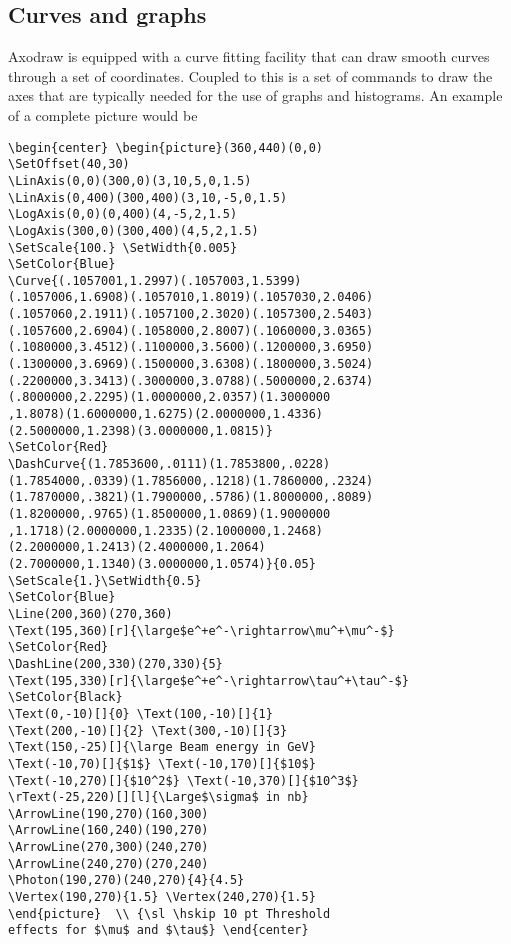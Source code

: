 \documentclass[11pt,a4paper]{article}
\begin{document}
\subsection{Curves and graphs}

Axodraw is equipped with a curve fitting facility that can draw smooth 
curves through a set of coordinates. Coupled to this is a set of 
commands to draw the axes that are typically needed for the use of 
graphs and histograms. An example of a complete picture would be
\IfColor{\textBlue}{}
\begin{verbatim}
\begin{center} \begin{picture}(360,440)(0,0)
\SetOffset(40,30)
\LinAxis(0,0)(300,0)(3,10,5,0,1.5)
\LinAxis(0,400)(300,400)(3,10,-5,0,1.5)
\LogAxis(0,0)(0,400)(4,-5,2,1.5)
\LogAxis(300,0)(300,400)(4,5,2,1.5)
\SetScale{100.} \SetWidth{0.005}
\SetColor{Blue}
\Curve{(.1057001,1.2997)(.1057003,1.5399)
(.1057006,1.6908)(.1057010,1.8019)(.1057030,2.0406)
(.1057060,2.1911)(.1057100,2.3020)(.1057300,2.5403)
(.1057600,2.6904)(.1058000,2.8007)(.1060000,3.0365)
(.1080000,3.4512)(.1100000,3.5600)(.1200000,3.6950)
(.1300000,3.6969)(.1500000,3.6308)(.1800000,3.5024)
(.2200000,3.3413)(.3000000,3.0788)(.5000000,2.6374)
(.8000000,2.2295)(1.0000000,2.0357)(1.3000000
,1.8078)(1.6000000,1.6275)(2.0000000,1.4336)
(2.5000000,1.2398)(3.0000000,1.0815)}
\SetColor{Red}
\DashCurve{(1.7853600,.0111)(1.7853800,.0228)
(1.7854000,.0339)(1.7856000,.1218)(1.7860000,.2324)
(1.7870000,.3821)(1.7900000,.5786)(1.8000000,.8089)
(1.8200000,.9765)(1.8500000,1.0869)(1.9000000
,1.1718)(2.0000000,1.2335)(2.1000000,1.2468)
(2.2000000,1.2413)(2.4000000,1.2064)
(2.7000000,1.1340)(3.0000000,1.0574)}{0.05}
\SetScale{1.}\SetWidth{0.5}
\SetColor{Blue}
\Line(200,360)(270,360)
\Text(195,360)[r]{\large$e^+e^-\rightarrow\mu^+\mu^-$}
\SetColor{Red}
\DashLine(200,330)(270,330){5}
\Text(195,330)[r]{\large$e^+e^-\rightarrow\tau^+\tau^-$}
\SetColor{Black}
\Text(0,-10)[]{0} \Text(100,-10)[]{1}
\Text(200,-10)[]{2} \Text(300,-10)[]{3}
\Text(150,-25)[]{\large Beam energy in GeV}
\Text(-10,70)[]{$1$} \Text(-10,170)[]{$10$}
\Text(-10,270)[]{$10^2$} \Text(-10,370)[]{$10^3$}
\rText(-25,220)[][l]{\Large$\sigma$ in nb}
\ArrowLine(190,270)(160,300)
\ArrowLine(160,240)(190,270)
\ArrowLine(270,300)(240,270)
\ArrowLine(240,270)(270,240)
\Photon(190,270)(240,270){4}{4.5}
\Vertex(190,270){1.5} \Vertex(240,270){1.5}
\end{picture}  \\ {\sl \hskip 10 pt Threshold
effects for $\mu$ and $\tau$} \end{center}
\end{verbatim}
\end{document}
